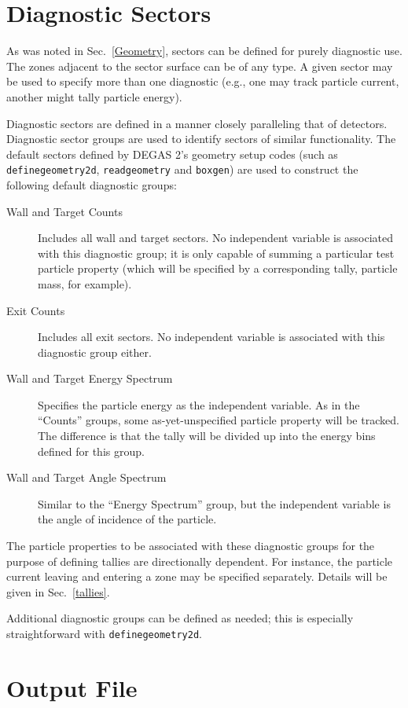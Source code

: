 \documentclass[12pt]{report}
\begin{document}
\section{Diagnostic Sectors}
\label{Diagnostic}

As was noted in Sec.~\ref{Geometry},
sectors can be defined for purely diagnostic use. The zones adjacent
to the sector surface can be of any type. A given sector may be used to
specify more than one diagnostic (e.g., one may track particle current,
another might tally particle energy).

Diagnostic sectors are defined in a manner closely paralleling that of 
detectors. Diagnostic sector groups are used to identify sectors of
similar functionality. The default sectors defined by DEGAS 2's
geometry setup codes (such as
{\tt definegeometry2d}, {\tt readgeometry} and {\tt boxgen})
are used to construct the following
default diagnostic groups:
\begin{description}
  \item[Wall and Target Counts] Includes all wall and target sectors. No
independent variable is associated with this diagnostic group; it is only
capable of summing a particular test particle property (which will be
specified by a corresponding tally, particle mass, for example).
  \item[Exit Counts] Includes all exit sectors. No
independent variable is associated with this diagnostic group either.
  \item[Wall and Target Energy Spectrum] Specifies the particle
energy as the independent variable. As in the ``Counts'' groups, some
as-yet-unspecified particle property will be tracked. The difference is
that the tally will be divided up into the energy bins defined for this
group.
  \item[Wall and Target Angle Spectrum] Similar to the ``Energy Spectrum''
group, but the independent variable is the angle of incidence of the particle.
\end{description}

The particle properties to be associated with these diagnostic
groups for the purpose of defining tallies are directionally
dependent. For instance, the particle current leaving and entering
a zone may be specified separately. Details will be given in 
Sec.~\ref{tallies}.

Additional diagnostic groups can be defined as needed; this is 
especially straightforward with {\tt definegeometry2d}. 

\section{Output File}
\label{outputformat}
\end{document}
